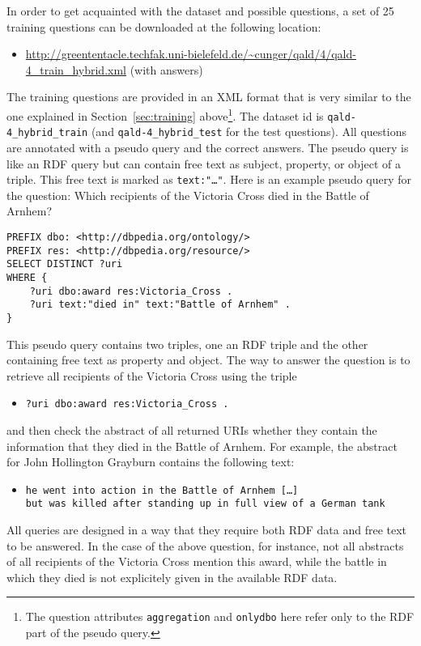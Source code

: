 In order to get acquainted with the dataset and possible questions, a set of 25 training questions can be downloaded at the following location: 
\begin{itemize} 
\item \url{http://greententacle.techfak.uni-bielefeld.de/~cunger/qald/4/qald-4_train_hybrid.xml} (with answers)
\end{itemize} 

The training questions are provided in an XML format that is very similar to the one explained in Section~\ref{sec:training} 
above\footnote{The question attributes \texttt{aggregation} and \texttt{onlydbo} here refer only to the RDF part of the pseudo query.}. 
The dataset id is \texttt{qald-4\_hybrid\_train} (and \texttt{qald-4\_hybrid\_test} for the test questions).
All questions are annotated with a pseudo query and the correct answers. 
The pseudo query is like an RDF query but can contain free text as subject, property, or object of a triple. 
This free text is marked as \texttt{text:"\ldots"}. 
Here is an example pseudo query for the question: \textsf{Which recipients of the Victoria Cross died in the Battle of Arnhem?}

\begin{lstlisting}
PREFIX dbo: <http://dbpedia.org/ontology/>
PREFIX res: <http://dbpedia.org/resource/>
SELECT DISTINCT ?uri 
WHERE {
	?uri dbo:award res:Victoria_Cross .
	?uri text:"died in" text:"Battle of Arnhem" .
}
\end{lstlisting}

This pseudo query contains two triples, one an RDF triple and the other containing free text as property and object. 
The way to answer the question is to retrieve all recipients of the Victoria Cross using the triple 
\begin{itemize}
\item[] \texttt{?uri dbo:award res:Victoria\_Cross .} 
\end{itemize}
and then check the abstract of all returned URIs whether they contain the information that they died in the Battle of Arnhem. 
For example, the abstract for John Hollington Grayburn contains the following text: 
\begin{itemize}
\item[] \texttt{he went into action in the Battle of Arnhem [\ldots] \\
but was killed after standing up in full view of a German tank}
\end{itemize}

All queries are designed in a way that they require both RDF data and free text to be answered. 
In the case of the above question, for instance, not all abstracts of all recipients of the Victoria Cross mention this award, 
while the battle in which they died is not explicitely given in the available RDF data.

